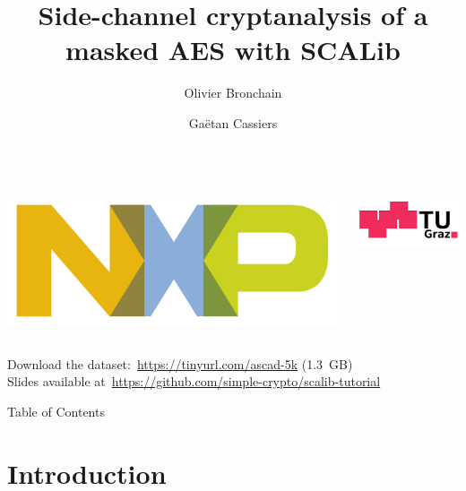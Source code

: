 \documentclass[aspectratio=169]{beamer}
\title{Side-channel cryptanalysis of a masked AES with SCALib}
\author[O. Bronchain, G. Cassiers]{
    Olivier Bronchain
    \and 
    Gaëtan Cassiers
}
\begin{document}
\begin{frame}{}
    \maketitle
    \begin{columns}
        \begin{column}{0.1\textwidth}
            \includegraphics[width=\textwidth]{logos/nxp.png}
        \end{column}
        \begin{column}{0.1\textwidth}
            \includegraphics[width=\textwidth]{logos/tugraz.png}
        \end{column}
    \end{columns}
    \vspace*{3ex}
    \begin{center}
        Download the dataset:~\url{https://tinyurl.com/ascad-5k} (1.3~GB) \\
        Slides available at~\url{https://github.com/simple-crypto/scalib-tutorial}
    \end{center}
\end{frame}

\begin{frame}{Table of Contents}
    \tableofcontents
\end{frame}

\section{Introduction}
\end{document}
